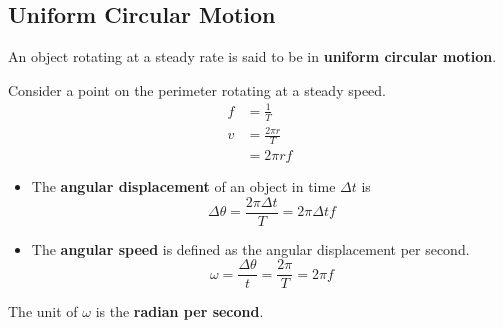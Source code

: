 \subsection{Uniform Circular Motion}

An object rotating at a steady rate is said to be in \textbf{uniform circular motion}.

Consider a point on the perimeter rotating at a steady speed.
\begin{align*}
    f&=\frac{1}{T}\\
    v&=\frac{2\pi r}{T}\\
     &=2\pi rf
\end{align*}

\begin{itemize}
    \item The \textbf{angular displacement} of an object in time $\Delta t$ is
        $$\Delta\theta=\frac{2\pi \Delta t}{T}=2\pi \Delta tf$$
    \item The \textbf{angular speed} is defined as the angular displacement per second.
        $$\omega=\frac{\Delta\theta}{t}=\frac{2\pi}{T}=2\pi f$$
\end{itemize}
The unit of $\omega$ is the \textbf{radian per second}.
